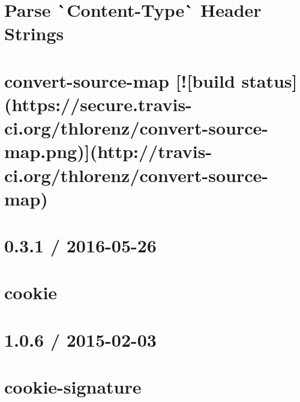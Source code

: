 \documentclass[twoside]{book}
\newcommand{\+}{\discretionary{\mbox{\scriptsize$\hookleftarrow$}}{}{}}
\begin{document}
\chapter{Parse \`{}\+Content-\/\+Type\`{} Header Strings}
\label{md__c_1_workspace_demo_src_main_script_node_modules_content-type-parser__r_e_a_d_m_e}

\chapter{convert-\/source-\/map \mbox{[}!\mbox{[}build status\mbox{]}(https\+://secure.travis-\/ci.org/thlorenz/convert-\/source-\/map.png)\mbox{]}(http\+://travis-\/ci.org/thlorenz/convert-\/source-\/map)}
\label{md__c_1_workspace_demo_src_main_script_node_modules_convert-source-map__r_e_a_d_m_e}

\chapter{0.3.1 / 2016-\/05-\/26}
\label{md__c_1_workspace_demo_src_main_script_node_modules_cookie__h_i_s_t_o_r_y}

\chapter{cookie}
\label{md__c_1_workspace_demo_src_main_script_node_modules_cookie__r_e_a_d_m_e}

\chapter{1.0.6 / 2015-\/02-\/03}
\label{md__c_1_workspace_demo_src_main_script_node_modules_cookie-signature__history}

\chapter{cookie-\/signature}
\label{md__c_1_workspace_demo_src_main_script_node_modules_cookie-signature__readme}

\end{document}
